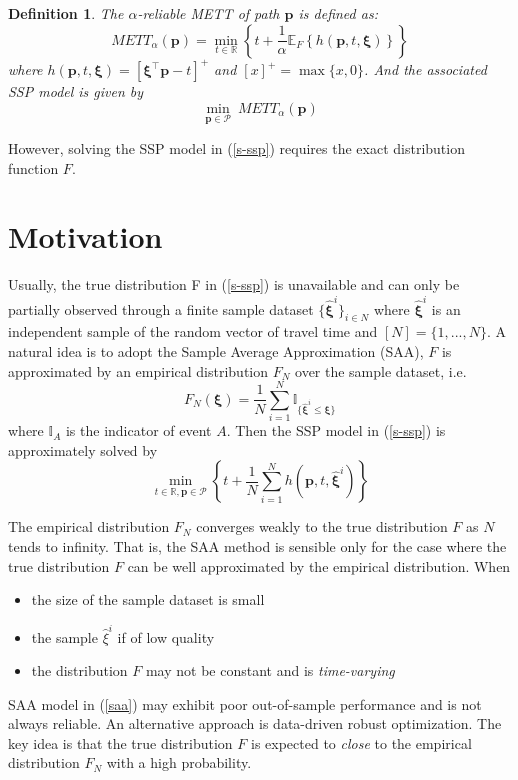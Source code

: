 \documentclass{article}
\newtheorem{defin}{Definition}
\begin{document}
\begin{defin}
	The $\alpha$-reliable METT of path $\bm{p}$ is defined as:
	\begin{equation}
		METT_{\alpha} (\bm{p}) = \min_{t \in \mathbb{R}} \left\{t + \frac{1}{\alpha} \mathbb{E}_{F}\left\{h(\bm{p}, t, \bm{\xi})\right\} \right\}
	\end{equation} 
	where $h(\bm{p}, t, \bm{\xi}) = [\bm{\xi}^\top\bm{p} - t]^+$ and $[x]^+ = \max\{x, 0\}$. And the associated SSP model is given by
	\begin{equation} \label{s-ssp}
		\min_{\bm{p} \in \mathcal{P}} \ METT_{\alpha} (\bm{p})
	\end{equation} 
\end{defin}

However, solving the SSP model in (\ref{s-ssp}) requires the exact distribution function $F$. 

\section{Motivation}

Usually, the true distribution F in (\ref{s-ssp}) is unavailable and can only be partially observed through a finite sample dataset $\{\hat{\bm{\xi}}^i\}_{i \in N}$
where $\hat{\bm{\xi}}^i$ is an independent sample of the random vector of travel time and $[N]=\{1,...,N\}$. A natural idea is to adopt the Sample Average Approximation (SAA), $F$ is approximated by an empirical distribution $F_N$ over the sample dataset, i.e.
\begin{equation}
	F_N(\bm{\xi}) = \frac{1}{N} \sum_{i=1}^{N} \mathbb{I}_{\{\hat{\bm{\xi}}^i \leq \bm{\xi}\}}
\end{equation}
where $\mathbb{I}_A$ is the indicator of event $A$. Then the SSP model in (\ref{s-ssp}) is approximately solved by
\begin{equation} \label{saa}
	\min_{t \in \mathbb{R}, \bm{p} \in \mathcal{P}} \left\{t + \frac{1}{N} \sum_{i=1}^{N} h(\bm{p}, t, \hat{\bm{\xi}}^i)\right\} 
\end{equation}

The empirical distribution $F_N$ converges weakly to the true distribution $F$ as $N$ tends to infinity. That is, the SAA method is sensible only for the case where the true distribution $F$ can be well approximated by the empirical distribution. When
\begin{itemize}
	\item the size of the sample dataset is small
	\item the sample $\hat{\xi}^i$ if of low quality
	\item the distribution $F$ may not be constant and is \textit{time-varying}
\end{itemize}
SAA model in (\ref{saa}) may exhibit poor out-of-sample performance and is not always reliable. An alternative approach is data-driven robust optimization. The key idea is that the true distribution $F$ is expected to \textit{close} to the empirical distribution $F_N$ with a high probability.
\end{document}
